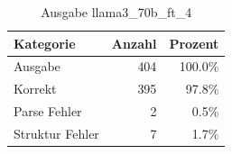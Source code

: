 
\begin{table}[!ht]
\centering
\begin{tabular}{lrr}
\toprule
\textbf{Kategorie} & \textbf{Anzahl} & \textbf{Prozent} \\
\midrule
Ausgabe & 404 & 100.0\% \\
Korrekt & 395 & 97.8\% \\
Parse Fehler & 2 & 0.5\% \\
Struktur Fehler & 7 & 1.7\% \\
\bottomrule
\end{tabular}
\caption{Ausgabe llama3_70b_ft_4}
\label{tab:file_counts}
\end{table}
    